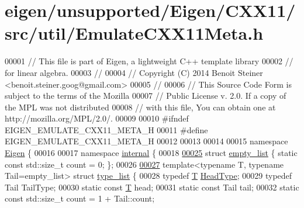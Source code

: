 \hypertarget{eigen_2unsupported_2_eigen_2_c_x_x11_2src_2util_2_emulate_c_x_x11_meta_8h_source}{}\section{eigen/unsupported/\+Eigen/\+C\+X\+X11/src/util/\+Emulate\+C\+X\+X11\+Meta.h}
\label{eigen_2unsupported_2_eigen_2_c_x_x11_2src_2util_2_emulate_c_x_x11_meta_8h_source}

\begin{DoxyCode}
00001 \textcolor{comment}{// This file is part of Eigen, a lightweight C++ template library}
00002 \textcolor{comment}{// for linear algebra.}
00003 \textcolor{comment}{//}
00004 \textcolor{comment}{// Copyright (C) 2014 Benoit Steiner <benoit.steiner.goog@gmail.com>}
00005 \textcolor{comment}{//}
00006 \textcolor{comment}{// This Source Code Form is subject to the terms of the Mozilla}
00007 \textcolor{comment}{// Public License v. 2.0. If a copy of the MPL was not distributed}
00008 \textcolor{comment}{// with this file, You can obtain one at http://mozilla.org/MPL/2.0/.}
00009 
00010 \textcolor{preprocessor}{#ifndef EIGEN\_EMULATE\_CXX11\_META\_H}
00011 \textcolor{preprocessor}{#define EIGEN\_EMULATE\_CXX11\_META\_H}
00012 
00013 
00014 
00015 \textcolor{keyword}{namespace }\hyperlink{namespace_eigen}{Eigen} \{
00016 
00017 \textcolor{keyword}{namespace }\hyperlink{namespaceinternal}{internal} \{
00018 
\hyperlink{struct_eigen_1_1internal_1_1empty__list}{00025} \textcolor{keyword}{struct }\hyperlink{struct_eigen_1_1internal_1_1empty__list}{empty\_list} \{ \textcolor{keyword}{static} \textcolor{keyword}{const} std::size\_t count = 0; \};
00026 
\hyperlink{struct_eigen_1_1internal_1_1type__list}{00027} \textcolor{keyword}{template}<\textcolor{keyword}{typename} T, \textcolor{keyword}{typename} Tail=empty\_list> \textcolor{keyword}{struct }\hyperlink{struct_eigen_1_1internal_1_1type__list}{type\_list} \{
00028   \textcolor{keyword}{typedef} \hyperlink{group___sparse_core___module}{T} \hyperlink{group___sparse_core___module}{HeadType};
00029   \textcolor{keyword}{typedef} Tail TailType;
00030   \textcolor{keyword}{static} \textcolor{keyword}{const} \hyperlink{group___sparse_core___module}{T} head;
00031   \textcolor{keyword}{static} \textcolor{keyword}{const} Tail tail;
00032   \textcolor{keyword}{static} \textcolor{keyword}{const} std::size\_t count = 1 + Tail::count;

\end{DoxyCode}
